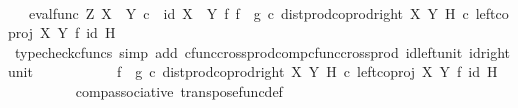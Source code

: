 \begin{isabellebody}
\ \ \ \ \ \ \isamarkupfalse%
\ \isamarkupfalse%
\ {\isachardoublequoteopen}{\isachardot}{\kern0pt}{\isachardot}{\kern0pt}{\isachardot}{\kern0pt}\ {\isacharequal}{\kern0pt}\ {\isacharparenleft}{\kern0pt}eval{\isacharunderscore}{\kern0pt}func\ Z\ {\isacharparenleft}{\kern0pt}X\ {\isasymCoprod}\ Y{\isacharparenright}{\kern0pt}\ {\isasymcirc}\isactrlsub c\ \ {\isacharparenleft}{\kern0pt}id\ {\isacharparenleft}{\kern0pt}X\ {\isasymCoprod}\ Y{\isacharparenright}{\kern0pt}\ {\isasymtimes}\isactrlsub f\ {\isacharparenleft}{\kern0pt}f\isactrlsup {\isasymflat}\ {\isasymamalg}\ g\isactrlsup {\isasymflat}\ {\isasymcirc}\isactrlsub c\ dist{\isacharunderscore}{\kern0pt}prod{\isacharunderscore}{\kern0pt}coprod{\isacharunderscore}{\kern0pt}right\ X\ Y\ H{\isacharparenright}{\kern0pt}\isactrlsup {\isasymsharp}{\isacharparenright}{\kern0pt}\ {\isasymcirc}\isactrlsub c\ {\isacharparenleft}{\kern0pt}left{\isacharunderscore}{\kern0pt}coproj\ X\ Y\ {\isasymtimes}\isactrlsub f\ id\ H{\isacharparenright}{\kern0pt}{\isacharparenright}{\kern0pt}\isactrlsup {\isasymsharp}{\isachardoublequoteclose}\isanewline
\ \ \ \ \ \ \ \ \isamarkupfalse%
\ {\isacharparenleft}{\kern0pt}typecheck{\isacharunderscore}{\kern0pt}cfuncs{\isacharcomma}{\kern0pt}\ simp\ add{\isacharcolon}{\kern0pt}\ cfunc{\isacharunderscore}{\kern0pt}cross{\isacharunderscore}{\kern0pt}prod{\isacharunderscore}{\kern0pt}comp{\isacharunderscore}{\kern0pt}cfunc{\isacharunderscore}{\kern0pt}cross{\isacharunderscore}{\kern0pt}prod\ id{\isacharunderscore}{\kern0pt}left{\isacharunderscore}{\kern0pt}unit{}\ id{\isacharunderscore}{\kern0pt}right{\isacharunderscore}{\kern0pt}unit{}{\isacharparenright}{\kern0pt}\isanewline
\ \ \ \ \ \ \isamarkupfalse%
\ \isamarkupfalse%
\ {\isachardoublequoteopen}{\isachardot}{\kern0pt}{\isachardot}{\kern0pt}{\isachardot}{\kern0pt}\ {\isacharequal}{\kern0pt}\ {\isacharparenleft}{\kern0pt}f\isactrlsup {\isasymflat}\ {\isasymamalg}\ g\isactrlsup {\isasymflat}\ {\isasymcirc}\isactrlsub c\ {\isacharparenleft}{\kern0pt}dist{\isacharunderscore}{\kern0pt}prod{\isacharunderscore}{\kern0pt}coprod{\isacharunderscore}{\kern0pt}right\ X\ Y\ H\ {\isasymcirc}\isactrlsub c\ left{\isacharunderscore}{\kern0pt}coproj\ X\ Y\ {\isasymtimes}\isactrlsub f\ id\ H{\isacharparenright}{\kern0pt}{\isacharparenright}{\kern0pt}\isactrlsup {\isasymsharp}{\isachardoublequoteclose}\isanewline
\ \ \ \ \ \ \ \ \isamarkupfalse%
\ comp{\isacharunderscore}{\kern0pt}associative{}\ transpose{\isacharunderscore}{\kern0pt}func{\isacharunderscore}{\kern0pt}def\ \isamarkupfalse%

\end{isabellebody}
